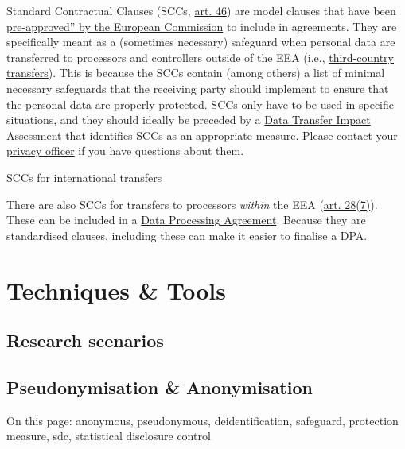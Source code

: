 \documentclass[
]{book}
\begin{document}
Standard Contractual Clauses (SCCs,
\href{https://gdpr-info.eu/art-46-gdpr/}{art. 46}) are
model clauses that have been
\href{https://ec.europa.eu/info/law/law-topic/data-protection/international-dimension-data-protection/standard-contractual-clauses-scc_en}{pre-approved'' by the European Commission}
to include in agreements. They are specifically meant as a (sometimes necessary)
safeguard when personal data are transferred to processors and controllers
outside of the EEA (i.e., \protect\hyperlink{third-country-transfer}{third-country transfers}).
This is because the SCCs contain (among others) a list of
minimal necessary safeguards that the receiving party should implement to ensure
that the personal data are properly protected. SCCs only have to be used in
specific situations, and they should ideally be preceded by a
\protect\hyperlink{dia}{Data Transfer Impact Assessment} that identifies SCCs as an
appropriate measure. Please contact your \protect\hyperlink{support}{privacy officer}
if you have questions about them.

SCCs for international transfers

There are also SCCs for transfers to processors \emph{within} the EEA
(\href{https://gdpr-info.eu/art-28-gdpr/}{art. 28(7)}).
These can be included in a
\protect\hyperlink{data-processing-agreement}{Data Processing Agreement}. Because they
are standardised clauses, including these can make it easier to finalise a DPA.

\hypertarget{part-techniques-tools}{%
\part*{Techniques \& Tools}\label{part-techniques-tools}}

\hypertarget{research-scenarios}{%
\chapter{Research scenarios}\label{research-scenarios}}

\hypertarget{pseudonymisation-anonymisation}{%
\chapter{Pseudonymisation \& Anonymisation}\label{pseudonymisation-anonymisation}}

On this page: anonymous, pseudonymous, deidentification, safeguard, protection
measure, sdc, statistical disclosure control
\end{document}
